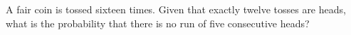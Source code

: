 A fair coin is tossed sixteen times. Given that exactly twelve tosses are heads, what is the probability that there is no run of five consecutive heads?
